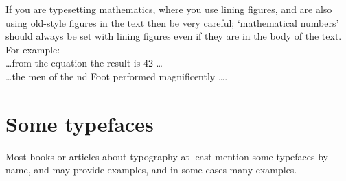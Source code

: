 \documentclass[10pt,letterpaper,extrafontsizes]{memoir}
\begin{document}
    If you are typesetting mathematics, where you use lining figures, and are also using
old-style figures in the text then be very careful; `mathematical numbers' should always
be set with lining figures even if they are in the body of the text. For example: \\
\ldots from the equation the result is 42 \ldots \\
\ldots the men of the nd Foot performed magnificently \ldots.


\appendix

\chapter{Some typefaces}

   Most books or articles about typography at least mention some typefaces
by name, and may provide examples, and in some cases many examples.
\end{document}
